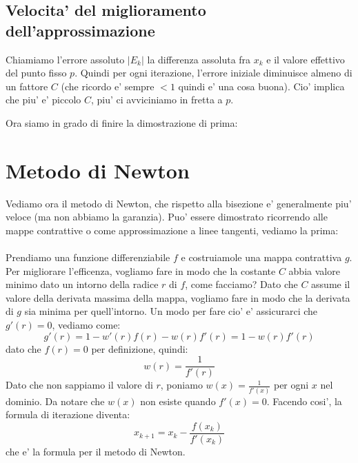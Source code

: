\subsection{Velocita' del miglioramento dell'approssimazione}
Chiamiamo l'errore assoluto $ |E_k| $ la differenza assoluta fra $ x_k $ e il valore effettivo del punto fisso $ p $.
Quindi per ogni iterazione, l'errore iniziale diminuisce almeno di un fattore $ C $ (che ricordo e' sempre $ <1 $ quindi e' una cosa buona). Cio' implica che piu' e' piccolo $ C $, piu' ci avviciniamo in fretta a $ p $. 

Ora siamo in grado di finire la dimostrazione di prima:

\section{Metodo di Newton}
Vediamo ora il metodo di Newton, che rispetto alla bisezione e' generalmente piu' veloce (ma non abbiamo la garanzia). Puo' essere dimostrato ricorrendo alle mappe contrattive o come approssimazione a linee tangenti, vediamo la prima:\\\\
Prendiamo una funzione differenziabile $ f $ e costruiamole una mappa contrattiva $ g $. Per migliorare l'efficenza, vogliamo fare in modo che la costante $ C $ abbia valore minimo dato un intorno della radice $ r $ di $ f $, come facciamo? Dato che $ C $ assume il valore della derivata massima della mappa, vogliamo fare in modo che la derivata di $ g $ sia minima per quell'intorno. Un modo per fare cio' e' assicurarci che $ g'(r) = 0 $, vediamo come:
\[
  g'(r) = 1 - w'(r)f(r) - w(r)f'(r) = 1 - w(r)f'(r)
\]
dato che $ f(r) = 0 $ per definizione, quindi:
\[
  w(r) = \frac{1}{f'(r)}
\]
Dato che non sappiamo il valore di $ r $, poniamo $ w(x) = \frac{1}{f'(x)} $ per ogni $ x $ nel dominio. Da notare che $ w(x) $ non esiste quando $ f'(x) = 0 $. Facendo cosi', la formula di iterazione diventa:
\[
  x_{k+1} = x_k - \frac{f(x_k)}{f'(x_k)}
\]
che e' la formula per il metodo di Newton.

